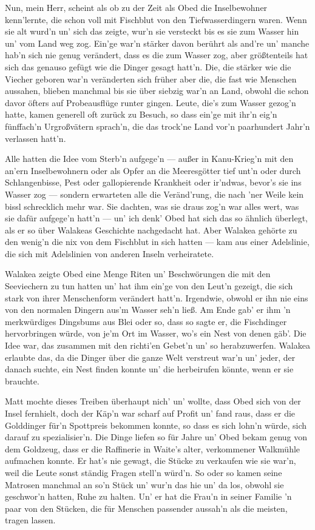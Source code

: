 Nun, mein Herr, scheint als ob zu der Zeit als Obed die Inselbewohner kenn'lernte, die schon voll mit Fischblut von den Tiefwasserdingern waren. Wenn sie alt wurd'n un' sich das zeigte, wur'n sie versteckt bis es sie zum Wasser hin un' vom Land weg zog. Ein'ge war'n stärker davon berührt als and're un' manche hab'n sich nie genug verändert, dass es die zum Wasser zog, aber größtenteils hat sich das genauso gefügt wie die Dinger gesagt hatt'n. Die, die stärker wie die Viecher geboren war'n veränderten sich früher aber die, die fast wie Menschen aussahen, blieben manchmal bis sie über siebzig war'n an Land, obwohl die schon davor öfters auf Probeausflüge runter gingen. Leute, die's zum Wasser gezog'n hatte, kamen generell oft zurück zu Besuch, so dass ein'ge mit ihr'n eig'n fünffach'n Urgroßvätern sprach'n, die das trock'ne Land vor'n paarhundert Jahr'n verlassen hatt'n.

Alle hatten die Idee vom Sterb'n aufgege'n --- außer in Kanu-Krieg'n mit den an'ern Inselbewohnern oder als Opfer an die Meeresgötter tief unt'n oder durch Schlangenbisse, Pest oder gallopierende Krankheit oder ir'ndwas, bevor's sie ins Wasser zog --- sondern erwarteten alle die Veränd'rung, die nach 'ner Weile kein bissl schrecklich mehr war. Sie dachten, was sie draus zog'n war alles wert, was sie dafür aufgege'n hatt'n --- un' ich denk' Obed hat sich das so ähnlich überlegt, als er so über Walakeas Geschichte nachgedacht hat. Aber Walakea gehörte zu den wenig'n die nix von dem Fischblut in sich hatten --- kam aus einer Adelslinie, die sich mit Adelslinien von anderen Inseln verheiratete.

Walakea zeigte Obed eine Menge Riten un' Beschwörungen die mit den Seeviechern zu tun hatten un' hat ihm ein'ge von den Leut'n gezeigt, die sich stark von ihrer Menschenform verändert hatt'n. Irgendwie, obwohl er ihn nie eins von den normalen Dingern aus'm Wasser seh'n ließ. Am Ende gab' er ihm 'n merkwürdiges Dingsbums aus Blei oder so, dass so sagte er, die Fischdinger hervorbringen würde, von je'm Ort im Wasser, wo's ein Nest von denen gäb'. Die Idee war, das zusammen mit den richti'en Gebet'n un' so herabzuwerfen. Walakea erlaubte das, da die Dinger über die ganze Welt verstreut war'n un' jeder, der danach suchte, ein Nest finden konnte un' die herbeirufen könnte, wenn er sie brauchte.

Matt mochte dieses Treiben überhaupt nich' un' wollte, dass Obed sich von der Insel fernhielt, doch der Käp'n war scharf auf Profit un' fand raus, dass er die Golddinger für'n Spottpreis bekommen konnte, so dass es sich lohn'n würde, sich darauf zu spezialisier'n. Die Dinge liefen so für Jahre un' Obed bekam genug von dem Goldzeug, dass er die Raffinerie in Waite's alter, verkommener Walkmühle aufmachen konnte. Er hat's nie gewagt, die Stücke zu verkaufen wie sie war'n, weil die Leute sonst ständig Fragen stell'n würd'n. So oder so kamen seine Matrosen manchmal an so'n Stück un' wur'n das hie un' da los, obwohl sie geschwor'n hatten, Ruhe zu halten. Un' er hat die Frau'n in seiner Familie 'n paar von den Stücken, die für  Menschen passender aussah'n als die meisten, tragen lassen.

